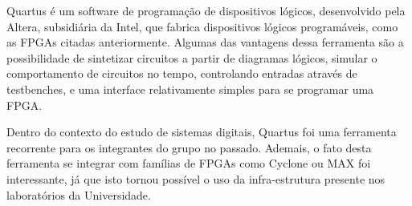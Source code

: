 	Quartus é um software de programação de dispositivos lógicos, desenvolvido pela Altera, subsidiária da Intel, que fabrica dispositivos lógicos programáveis, como as FPGAs citadas anteriormente. Algumas das vantagens dessa ferramenta são a possibilidade de sintetizar circuitos a partir de diagramas lógicos,  simular o comportamento de circuitos no tempo, controlando entradas através de testbenches, e uma interface relativamente simples para se programar uma FPGA.
	
	Dentro do contexto do estudo de sistemas digitais, Quartus foi uma ferramenta recorrente para os integrantes do grupo no passado. Ademais, o fato desta ferramenta se integrar com famílias de FPGAs como Cyclone ou MAX foi interessante, já que isto tornou possível o uso da infra-estrutura presente nos laboratórios da Universidade.
